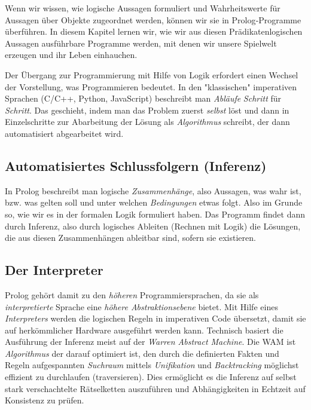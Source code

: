 \documentclass[parskip=half,a4paper,11pt]{scrreprt}
\begin{document}
Wenn wir wissen, wie logische Aussagen formuliert und Wahrheitswerte für Aussagen über Objekte zugeordnet werden, können wir sie in Prolog‑Programme überführen. In diesem Kapitel lernen wir, wie wir aus diesen Prädikatenlogischen Aussagen ausführbare Programme werden, mit denen wir unsere Spielwelt erzeugen und ihr Leben einhauchen. 

Der Übergang zur Programmierung mit Hilfe von Logik erfordert einen Wechsel der Vorstellung, was Programmieren bedeutet. In den "klassischen" imperativen Sprachen (C/C++, Python, JavaScript) beschreibt man \textit{Abläufe} \textit{Schritt} für\textit{ Schritt}. Das geschieht, indem man das Problem zuerst \textit{selbst} löst und dann in Einzelschritte zur Abarbeitung der Lösung als \textit{Algorithmus} schreibt, der dann automatisiert abgearbeitet wird.

\subsection{Automatisiertes Schlussfolgern (Inferenz)}

In Prolog beschreibt man logische \textit{Zusammenhänge}, also Aussagen, was wahr ist, bzw. was gelten soll und unter welchen \textit{Bedingungen }etwas folgt. Also im Grunde so, wie wir es in der formalen Logik formuliert haben. Das Programm findet dann durch Inferenz, also durch logisches Ableiten (Rechnen mit Logik) die Lösungen, die aus diesen Zusammenhängen ableitbar sind, sofern sie existieren. 

\subsection{ Der Interpreter}

Prolog gehört damit zu den \textit{höheren} Programmiersprachen, da sie als \textit{interpretierte }Sprache eine \textit{höhere Abstraktionsebene} bietet. Mit Hilfe eines \textit{Interpreters} werden  die logischen Regeln in imperativen Code übersetzt, damit sie auf herkömmlicher Hardware ausgeführt werden kann. Technisch basiert die Ausführung der Inferenz meist auf der \textit{Warren Abstract Machine}. Die WAM ist \textit{Algorithmus} der darauf optimiert ist, den durch die definierten Fakten und Regeln aufgespannten \textit{Suchraum} mittels \textit{Unifikation} und \textit{Backtracking} möglichst effizient zu durchlaufen (traversieren). Dies ermöglicht es die Inferenz auf selbst stark verschachtelte Rätselketten auszuführen und Abhängigkeiten in Echtzeit auf Konsistenz zu prüfen.
\end{document}
